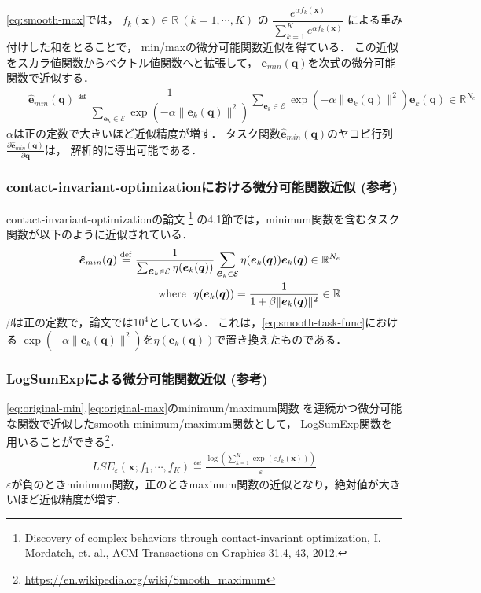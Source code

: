 \eqref{eq:smooth-max}では，
$f_k(\bm{x}) \in \mathbb{R} \ (k=1,\cdots,K)$
の
$\dfrac{e^{\alpha f_k(\bm{x})}}{\sum_{k=1}^{K} e^{\alpha f_k(\bm{x})}}$
による重み付けした和をとることで，
min/maxの微分可能関数近似を得ている．
この近似をスカラ値関数からベクトル値関数へと拡張して，
$\bm{e}_{min}(\bm{q})$を次式の微分可能関数で近似する．
\begin{eqnarray}
  &&\bm{\hat{e}}_{min}(\bm{q}) \eqdef
  \dfrac{1}{ \sum_{\bm{e}_k \in \mathcal{E}} \exp(-\alpha \| \bm{e}_k(\bm{q}) \|^2) }
  \sum_{\bm{e}_k \in \mathcal{E}} \exp(-\alpha \| \bm{e}_k(\bm{q}) \|^2) \bm{e}_k(\bm{q}) \in \mathbb{R}^{N_e} \label{eq:smooth-task-func}
\end{eqnarray}
$\alpha$は正の定数で大きいほど近似精度が増す．
タスク関数$\bm{\hat{e}}_{min}(\bm{q})$のヤコビ行列$\frac{\partial \bm{\hat{e}}_{min}(\bm{q})}{\partial \bm{q}}$は，
解析的に導出可能である．

\subsubsection*{contact-invariant-optimizationにおける微分可能関数近似 (参考)}
contact-invariant-optimizationの論文
\footnote{
  Discovery of complex behaviors through contact-invariant optimization,
  I. Mordatch, et. al.,
  ACM Transactions on Graphics 31.4, 43, 2012.
}
の4.1節では，minimum関数を含むタスク関数が以下のように近似されている．
\begin{eqnarray}
  &&\mbox{\boldmath{$\hat{e}$}}_{min}(\mbox{\boldmath{$q$}}) \stackrel{\mathrm{def}}{=}
  \dfrac{1}{ \sum_{\mbox{\boldmath{$e$}}_k \in \mathcal{E}} \eta(\mbox{\boldmath{$e$}}_k(\mbox{\boldmath{$q$}})) }
  \sum_{\mbox{\boldmath{$e$}}_k \in \mathcal{E}} \eta(\mbox{\boldmath{$e$}}_k(\mbox{\boldmath{$q$}})) \mbox{\boldmath{$e$}}_k(\mbox{\boldmath{$q$}}) \in \mathbb{R}^{N_e} \\
  &&{\rm where \ \ } \eta(\mbox{\boldmath{$e$}}_k(\mbox{\boldmath{$q$}})) = \frac{1}{1 + \beta \| \mbox{\boldmath{$e$}}_k(\mbox{\boldmath{$q$}}) \|^2} \in \mathbb{R}
\end{eqnarray}
$\beta$は正の定数で，論文では$10^4$としている．
これは，\eqref{eq:smooth-task-func}における
$\exp(-\alpha \| \bm{e}_k(\bm{q}) \|^2)$を$\eta(\bm{e}_k(\bm{q}))$で置き換えたものである．

\subsubsection*{LogSumExpによる微分可能関数近似 (参考)}

\eqref{eq:original-min},\eqref{eq:original-max}のminimum/maximum関数
を連続かつ微分可能な関数で近似したsmooth minimum/maximum関数として，
LogSumExp関数を用いることができる\footnote{\url{https://en.wikipedia.org/wiki/Smooth_maximum}}．
\begin{eqnarray}
  LSE_{\varepsilon}(\bm{x}; f_1, \cdots, f_K) \eqdef \frac{\log \left( \sum_{k=1}^{K} \exp( \varepsilon f_k(\bm{x})) \right) }{\varepsilon} \label{eq:lse-smooth-max}
\end{eqnarray}
$\varepsilon$が負のときminimum関数，正のときmaximum関数の近似となり，絶対値が大きいほど近似精度が増す．

